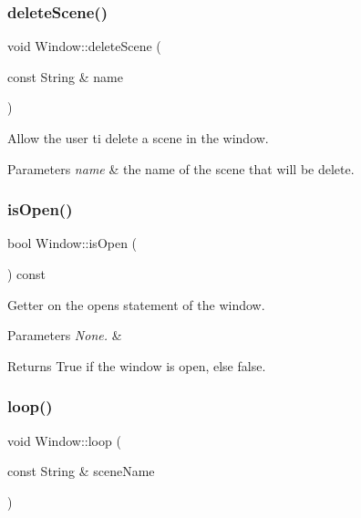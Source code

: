 \subsubsection{\texorpdfstring{delete\+Scene()}{deleteScene()}}
{\footnotesize\ttfamily void Window\+::delete\+Scene (\begin{DoxyParamCaption}\item[{const String \&}]{name }\end{DoxyParamCaption})}



Allow the user ti delete a scene in the window. 


\begin{DoxyParams}{Parameters}
{\em \textquotesingle{}name\textquotesingle{}} & the name of the scene that will be delete. \\
\hline
\end{DoxyParams}
\mbox{\label{classWindow_a761d614931fb5a5daa70e4f580c3e78e}} 
\subsubsection{\texorpdfstring{is\+Open()}{isOpen()}}
{\footnotesize\ttfamily bool Window\+::is\+Open (\begin{DoxyParamCaption}{ }\end{DoxyParamCaption}) const}



Getter on the open\textquotesingle{}s statement of the window. 


\begin{DoxyParams}{Parameters}
{\em None.} & \\
\hline
\end{DoxyParams}
\begin{DoxyReturn}{Returns}
True if the window is open, else false. 
\end{DoxyReturn}
\mbox{\label{classWindow_a9c9f1fd6ebc2b93f16ca870487a4a4c6}} 
\subsubsection{\texorpdfstring{loop()}{loop()}}
{\footnotesize\ttfamily void Window\+::loop (\begin{DoxyParamCaption}\item[{const String \&}]{scene\+Name }\end{DoxyParamCaption})}




